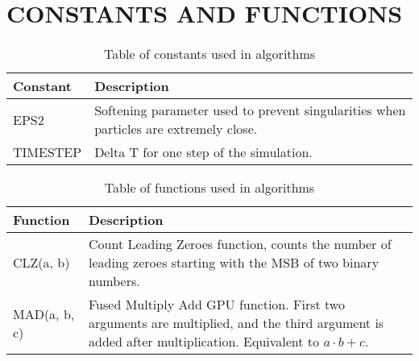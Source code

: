 \documentclass{thesis}
\begin{document}
\chapter{CONSTANTS AND FUNCTIONS}
\begin{table}[!h]
    \centering
    \caption{Table of constants used in algorithms}
    \label{tab:Constants}
    \begin{tabular}{|p{3cm}|p{10cm}|}
        \hline
        Constant & Description \\
        \hline\hline
        EPS2 & Softening parameter used to prevent singularities when particles are extremely close.\\
        \hline
        TIMESTEP & Delta T for one step of the simulation.\\
        \hline
    \end{tabular}
\end{table}
\begin{table}[!h]
    \centering
    \caption{Table of functions used in algorithms}
    \label{tab:Functions}
    \begin{tabular}{|p{3cm}|p{10cm}|}
        \hline
        Function & Description \\
        \hline\hline
        CLZ(a, b) & Count Leading Zeroes function, counts the number of leading zeroes starting with the MSB of two binary numbers.\\
        \hline
        MAD(a, b, c) & Fused Multiply Add GPU function. First two arguments are multiplied, and the third argument is added after multiplication. Equivalent to $a \cdot b + c$.\\
        \hline
    \end{tabular}
\end{table}

\end{document}
